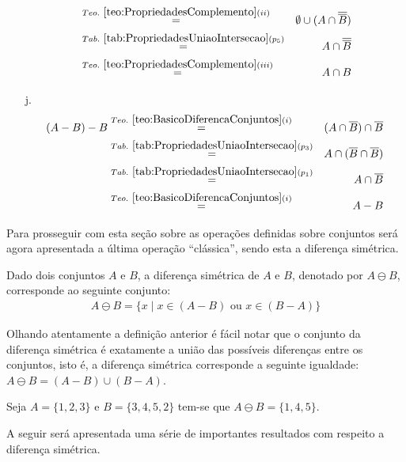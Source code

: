 \begin{prova}
\begin{itemize}
\begin{eqnarray*}
			& \stackrel{Teo. \ \ref{teo:PropriedadesComplemento}(ii)}{=}& \emptyset  \cup (A \cap \overline{\overline{B}})\\
			& \stackrel{Tab. \ \ref{tab:PropriedadesUniaoIntersecao}(p_5)}{=}& A \cap \overline{\overline{B}}\\
			& \stackrel{Teo. \ \ref{teo:PropriedadesComplemento}(iii)}{=}& A \cap B
		\end{eqnarray*}
		\item[j.]
		\begin{eqnarray*}
			(A - B) - B & \stackrel{Teo. \  \ref{teo:BasicoDiferencaConjuntos}(i)}{=} & (A \cap \overline{B}) \cap \overline{B}\\
			& \stackrel{Tab. \ \ref{tab:PropriedadesUniaoIntersecao}(p_3)}{=}& A \cap (\overline{B} \cap \overline{B})\\
			& \stackrel{Tab. \ \ref{tab:PropriedadesUniaoIntersecao}(p_1)}{=}& A \cap \overline{B}\\
			& \stackrel{Teo. \  \ref{teo:BasicoDiferencaConjuntos}(i)}{=} & A - B
		\end{eqnarray*}
	\end{itemize}
\end{prova}

Para prosseguir com esta seção sobre as operações definidas sobre conjuntos será agora apresentada a última operação ``clássica'', sendo esta a diferença simétrica.

\begin{definicao}\label{def:DiferencaSimetricaConjuntos}
	Dado dois conjuntos $A$ e $B$, a diferença simétrica de $A$ e $B$, denotado por $A \ominus B$, corresponde ao seguinte conjunto:
  \begin{eqnarray*}
    A \ominus B = \{x \mid x \in (A - B) \mbox{ ou } x \in (B - A)\}
  \end{eqnarray*}
\end{definicao}

Olhando atentamente a definição anterior é fácil notar que o conjunto da diferença simétrica é exatamente a união das possíveis diferenças entre os conjuntos, isto é, a diferença simétrica corresponde a seguinte igualdade: $A \ominus B = (A - B) \cup (B - A)$.

\begin{exemplo}\label{exe:DiferencaSimetricaConjuntos1}
  Seja $A = \{1, 2, 3\}$ e $B = \{3, 4, 5, 2\}$ tem-se que $A \ominus B = \{1, 4, 5\}$.
\end{exemplo}

A seguir será apresentada uma série de importantes resultados com respeito a diferença simétrica.

